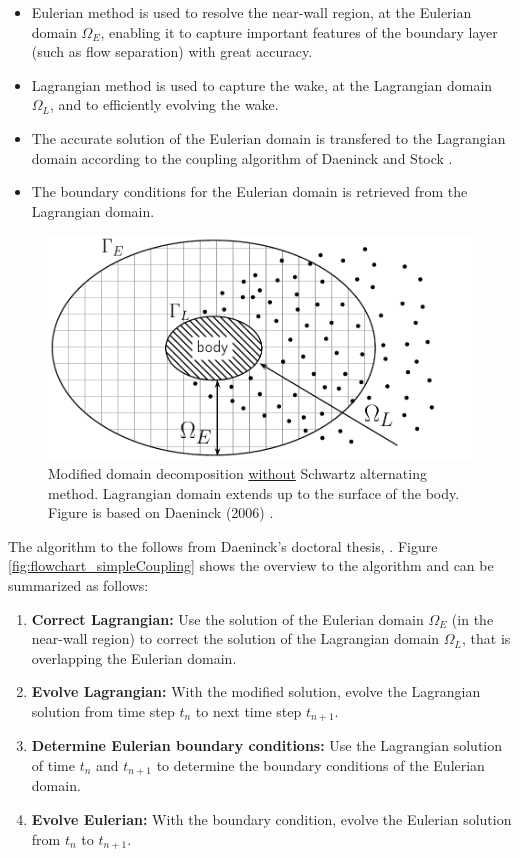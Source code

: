 	\begin{itemize}
	\item Eulerian method is used to resolve the near-wall region, at the Eulerian domain $\Omega_E$, enabling it to capture important features of the boundary layer (such as flow separation) with great accuracy.
	
	\item Lagrangian method is used to capture the wake, at the Lagrangian domain $\Omega_L$, and to efficiently evolving the wake.
	
	\item The accurate solution of the Eulerian domain is transfered to the Lagrangian domain according to the coupling algorithm of Daeninck \cite{Daeninck2006} and Stock \cite{Stock}.
	
	\item The boundary conditions for the Eulerian domain is retrieved from the Lagrangian domain.
	\end{itemize}

	\begin{figure}[!t]
		\centering
		\includegraphics[width=0.6\linewidth]{figures/introduction/domainDecomposition_daenick_type2.pdf}
		\caption{Modified domain decomposition \underline{without} Schwartz alternating method. Lagrangian domain extends up to the surface of the body. Figure is based on Daeninck (2006) \cite{Daeninck2006}.}
		\label{fig:domainDecomposition_daenick}
	\end{figure}

The algorithm to the  follows from Daeninck's doctoral thesis, \cite{Daeninck2006}. Figure \ref{fig:flowchart_simpleCoupling} shows the overview to the algorithm and can be summarized as follows:

	\begin{enumerate}
	\item \textbf{Correct Lagrangian:} Use the solution of the Eulerian domain $\Omega_E$ (in the near-wall region) to correct the solution of the Lagrangian domain $\Omega_L$, that is overlapping the Eulerian domain.  
	
	\item \textbf{Evolve Lagrangian:} With the modified solution, evolve the Lagrangian solution from time step $t_n$ to next time step $t_{n+1}$.
	
	\item \textbf{Determine Eulerian boundary conditions:} Use the Lagrangian solution of time $t_n$ and $t_{n+1}$ to determine the boundary conditions of the Eulerian domain.
	
	\item \textbf{Evolve Eulerian:} With the boundary condition, evolve the Eulerian solution from $t_n$ to $t_{n+1}$.
	\end{enumerate}
	
